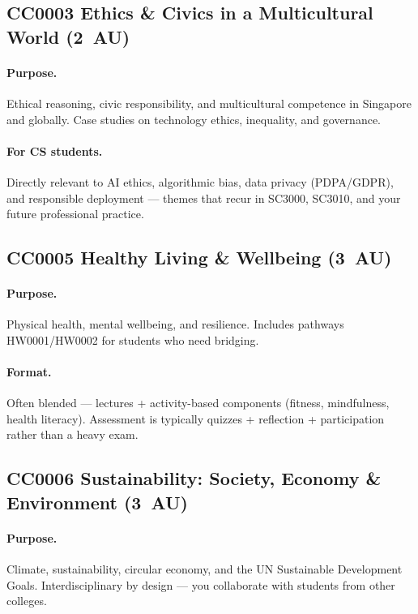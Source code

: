 \subsection{CC0003 Ethics \& Civics in a Multicultural World (2~AU)}
\paragraph{Purpose.} Ethical reasoning, civic responsibility, and multicultural competence in Singapore and globally. Case studies on technology ethics, inequality, and governance.

\paragraph{For CS students.} Directly relevant to AI ethics, algorithmic bias, data privacy (PDPA/GDPR), and responsible deployment --- themes that recur in SC3000, SC3010, and your future professional practice.

\subsection{CC0005 Healthy Living \& Wellbeing (3~AU)}
\paragraph{Purpose.} Physical health, mental wellbeing, and resilience. Includes pathways HW0001/HW0002 for students who need bridging.

\paragraph{Format.} Often blended --- lectures + activity-based components (fitness, mindfulness, health literacy). Assessment is typically quizzes + reflection + participation rather than a heavy exam.

\subsection{CC0006 Sustainability: Society, Economy \& Environment (3~AU)}
\paragraph{Purpose.} Climate, sustainability, circular economy, and the UN Sustainable Development Goals. Interdisciplinary by design --- you collaborate with students from other colleges.

